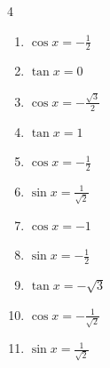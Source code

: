 \begin{multicols}{4}
\begin{enumerate}
  \item $\displaystyle \cos{x}  = -\frac{1}{2}$


  \item $\displaystyle \tan{x}  = 0$

        \phantom{$\displaystyle x = 0 , \pi$}

  \item $\displaystyle \cos{x}  = -\frac{\sqrt{3}}{2}$


  \item $\displaystyle \tan{x}  = 1$


  \item $\displaystyle \cos{x}  = -\frac{1}{2}$


\columnbreak %

  \item $\displaystyle \sin{x}  = \frac{1}{\sqrt{2}}$


  \item $\displaystyle \cos{x}  = -1$

        \phantom{$\displaystyle x = \pi$}

  \item $\displaystyle \sin{x}  = -\frac{1}{2}$


  \item $\displaystyle \tan{x}  = -\sqrt{3}$


  \item $\displaystyle \cos{x}  = -\frac{1}{\sqrt{2}}$


  \item $\displaystyle \sin{x}  = \frac{1}{\sqrt{2}}$



\end{enumerate}
\end{multicols}

